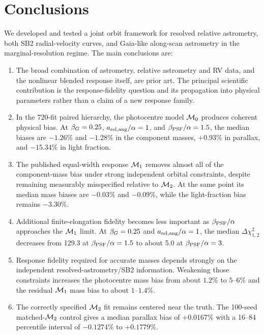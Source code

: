 \section{Conclusions}
\label{sect:conclusion}

We developed and tested a joint orbit framework for resolved relative astrometry, both SB2 radial-velocity curves, and Gaia-like along-scan astrometry in the marginal-resolution regime. The main conclusions are:

\begin{enumerate}
\item The broad combination of astrometry, relative astrometry and RV data, and the nonlinear blended response itself, are prior art. The principal scientific contribution is the response-fidelity question and its propagation into physical parameters rather than a claim of a new response family.

\item In the 720-fit paired hierarchy, the photocentre model $\mathcal{M}_0$ produces coherent physical bias. At $\beta_G=0.25$, $a_{\rm rel,ang}/\alpha=1$, and $\beta_{\rm PSF}/\alpha=1.5$, the median biases are $-1.26\%$ and $-1.28\%$ in the component masses, $+0.93\%$ in parallax, and $-15.34\%$ in light fraction.

\item The published equal-width response $\mathcal{M}_1$ removes almost all of the component-mass bias under strong independent orbital constraints, despite remaining measurably misspecified relative to $\mathcal{M}_2$. At the same point its median mass biases are $-0.03\%$ and $-0.09\%$, while the light-fraction bias remains $-3.30\%$.

\item Additional finite-elongation fidelity becomes less important as $\beta_{\rm PSF}/\alpha$ approaches the $\mathcal{M}_1$ limit. At $\beta_G=0.25$ and $a_{\rm rel,ang}/\alpha=1$, the median $\Delta\chi^2_{1,2}$ decreases from 129.3 at $\beta_{\rm PSF}/\alpha=1.5$ to about 5.0 at $\beta_{\rm PSF}/\alpha=3$.

\item Response fidelity required for accurate masses depends strongly on the independent resolved-astrometry/SB2 information. Weakening those constraints increases the photocentre mass bias from about $1.2\%$ to $5$--$6\%$ and the residual $\mathcal{M}_1$ mass bias to about $1$--$1.4\%$.

\item The correctly specified $\mathcal{M}_2$ fit remains centered near the truth. The 100-seed matched-$\mathcal{M}_2$ control gives a median parallax bias of $+0.0167\%$ with a 16--84 percentile interval of $-0.1274\%$ to $+0.1779\%$.


\end{enumerate}
